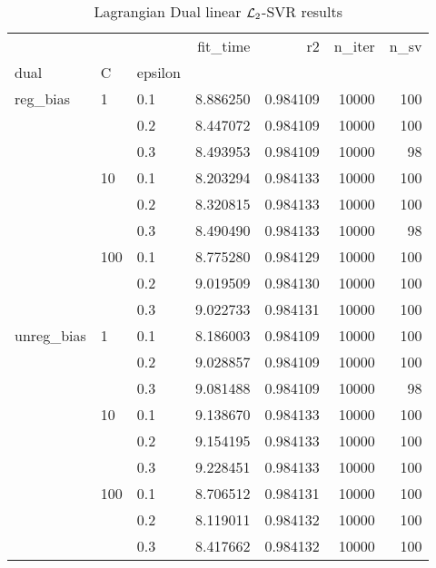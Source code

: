 \begin{table}[H]
\centering
\caption{Lagrangian Dual linear $\protect \mathcal{L}_2$-SVR results}
\label{linear_lagrangian_dual_l2_svr_cv_results}
\begin{tabular}{lllrrrr}
\toprule
           &     &     &  fit\_time &        r2 &  n\_iter &  n\_sv \\
dual & C & epsilon &           &           &         &       \\
\midrule
reg\_bias & 1   & 0.1 &  8.886250 &  0.984109 &   10000 &   100 \\
           &     & 0.2 &  8.447072 &  0.984109 &   10000 &   100 \\
           &     & 0.3 &  8.493953 &  0.984109 &   10000 &    98 \\
           & 10  & 0.1 &  8.203294 &  0.984133 &   10000 &   100 \\
           &     & 0.2 &  8.320815 &  0.984133 &   10000 &   100 \\
           &     & 0.3 &  8.490490 &  0.984133 &   10000 &    98 \\
           & 100 & 0.1 &  8.775280 &  0.984129 &   10000 &   100 \\
           &     & 0.2 &  9.019509 &  0.984130 &   10000 &   100 \\
           &     & 0.3 &  9.022733 &  0.984131 &   10000 &   100 \\
unreg\_bias & 1   & 0.1 &  8.186003 &  0.984109 &   10000 &   100 \\
           &     & 0.2 &  9.028857 &  0.984109 &   10000 &   100 \\
           &     & 0.3 &  9.081488 &  0.984109 &   10000 &    98 \\
           & 10  & 0.1 &  9.138670 &  0.984133 &   10000 &   100 \\
           &     & 0.2 &  9.154195 &  0.984133 &   10000 &   100 \\
           &     & 0.3 &  9.228451 &  0.984133 &   10000 &   100 \\
           & 100 & 0.1 &  8.706512 &  0.984131 &   10000 &   100 \\
           &     & 0.2 &  8.119011 &  0.984132 &   10000 &   100 \\
           &     & 0.3 &  8.417662 &  0.984132 &   10000 &   100 \\
\bottomrule
\end{tabular}
\end{table}
